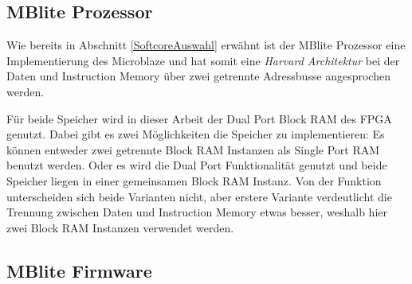 \subsection{MBlite Prozessor}
Wie bereits in Abschnitt \ref{SoftcoreAuswahl} erwähnt ist der  MBlite Prozessor eine Implementierung des Microblaze und hat somit eine \emph{Harvard Architektur} bei der Daten und Instruction Memory über zwei getrennte Adressbusse angesprochen werden.

Für beide Speicher wird in dieser Arbeit der Dual Port Block RAM des FPGA genutzt. Dabei gibt es zwei Möglichkeiten die Speicher zu implementieren: Es können entweder zwei getrennte Block RAM Instanzen als Single Port RAM benutzt werden. Oder es wird die Dual Port Funktionalität genutzt und beide Speicher liegen in  einer gemeinsamen Block RAM Instanz. Von der Funktion unterscheiden sich beide Varianten nicht, aber erstere Variante verdeutlicht die Trennung zwischen Daten und Instruction Memory etwas besser, weshalb hier zwei Block RAM Instanzen verwendet werden.





\subsection{MBlite Firmware}
